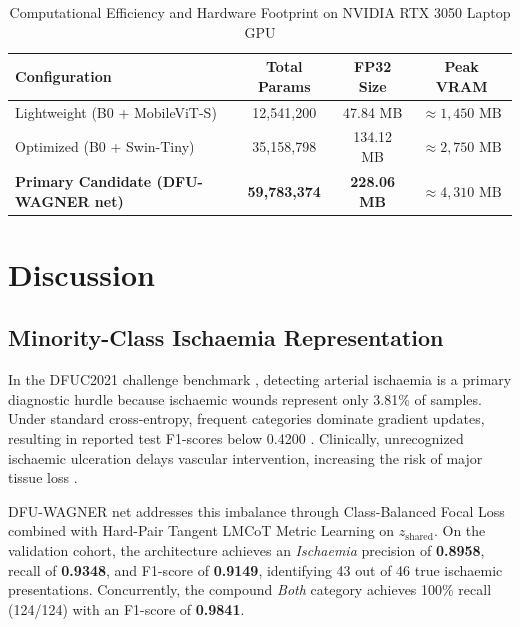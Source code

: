 \documentclass[journal]{IEEEtran}
\begin{document}
\begin{table}[h]
\centering
\caption{Computational Efficiency and Hardware Footprint on NVIDIA RTX 3050 Laptop GPU}
\label{tab:compute_efficiency}
\begin{tabular}{lccc}
\toprule
\textbf{Configuration} & \textbf{Total Params} & \textbf{FP32 Size} & \textbf{Peak VRAM} \\
\midrule
Lightweight (B0 + MobileViT-S) & 12,541,200 & 47.84 MB & $\approx 1,450\text{ MB}$ \\
Optimized (B0 + Swin-Tiny) & 35,158,798 & 134.12 MB & $\approx 2,750\text{ MB}$ \\
\textbf{Primary Candidate (DFU-WAGNER net)} & \textbf{59,783,374} & \textbf{228.06 MB} & \textbf{$\approx 4,310\text{ MB}$} \\
\bottomrule
\end{tabular}
\end{table}

\section{Discussion}

\subsection{Minority-Class Ischaemia Representation}
In the DFUC2021 challenge benchmark \cite{cassidy2021diabetic}, detecting arterial ischaemia is a primary diagnostic hurdle because ischaemic wounds represent only 3.81\% of samples. Under standard cross-entropy, frequent categories dominate gradient updates, resulting in reported test F1-scores below 0.4200 \cite{galdran2021convolutional, toofanee2023dfu}. Clinically, unrecognized ischaemic ulceration delays vascular intervention, increasing the risk of major tissue loss \cite{armstrong1998validation}.

DFU-WAGNER net addresses this imbalance through Class-Balanced Focal Loss combined with Hard-Pair Tangent LMCoT Metric Learning on $z_{\text{shared}}$. On the validation cohort, the architecture achieves an \textit{Ischaemia} precision of \textbf{0.8958}, recall of \textbf{0.9348}, and F1-score of \textbf{0.9149}, identifying 43 out of 46 true ischaemic presentations. Concurrently, the compound \textit{Both} category achieves 100\% recall (124/124) with an F1-score of \textbf{0.9841}.
\end{document}
